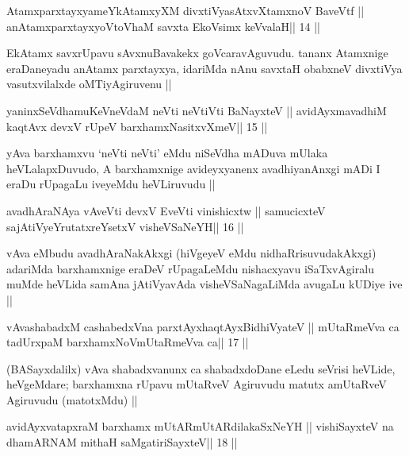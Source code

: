 \begin{shl}
AtamxparxtayxyameYkAtamxyXM divxtiVyasAtxvXtamxnoV BaveVtf ||
anAtamxparxtayxyoV\s toV\s haM savxta EkoV\s simx keVvalaH\hfill || 14 ||
\end{shl}

\begin{artha}
EkAtamx savxrUpavu sAvxnuBavakekx goVcaravAguvudu. tananx Atamxnige
eraDaneyadu anAtamx parxtayxya, idariMda nAnu savxtaH obabxneV
divxtiVya vasutxvilalxde oMTiyAgiruvenu || 
\end{artha}



\begin{shl}
yaninxSeVdhamuKeVneVdaM neVti neVtiVti BaNayxteV ||
avidAyxmavadhiM kaqtAvx devxV rUpeV barxhamxNasitxvXmeV\hfill || 15 ||
\end{shl}

\begin{artha}
yAva barxhamxvu `neVti neVti' eMdu niSeVdha mADuva mUlaka
heVLalapxDuvudo, A barxhamxnige avideyxyanenx avadhiyanAnxgi mADi I
eraDu rUpagaLu iveyeMdu heVLiruvudu ||
\end{artha}



\begin{shl}
avadhAraNAya vAveVti devxV EveVti vinishicxtw ||
samucicxteV sajAtiVyeYrutatxreYsetxV visheVSaNeYH\hfill || 16 ||
\end{shl}

\begin{artha}
vAva eMbudu avadhAraNakAkxgi (hiVgeyeV eMdu nidhaRrisuvudakAkxgi)
adariMda barxhamxnige eraDeV rUpagaLeMdu nishacxyavu iSaTxvAgiralu
muMde heVLida samAna jAtiVyavAda visheVSaNagaLiMda avugaLu kUDiye ive ||
\end{artha}

\begin{shl}
vAvashabadxM cashabedxVna parxtAyxhaqtAyxBidhiVyateV ||
mUtaRmeVva ca tadUrxpaM barxhamxNoV\s mUtaRmeVva ca\hfill || 17 ||
\end{shl}

\begin{artha}
(BASayxdalilx) vAva shabadxvanunx ca shabadxdoDane eLedu seVrisi
  heVLide, heVgeMdare; barxhamxna rUpavu mUtaRveV Agiruvudu matutx amUtaRveV Agiruvudu (matotxMdu) ||
\end{artha}

\begin{shl}
avidAyxvatapxraM barxhamx mUtARmUtARdilakaSxNeYH ||
vishiSayxteV na dhamARNAM mithaH saMgatiriSayxteV\hfill || 18 ||
\end{shl}

